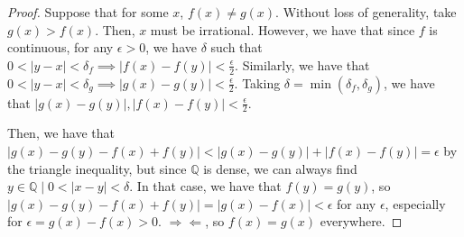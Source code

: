 \documentclass[12pt,letterpaper]{article}
\theoremstyle{definition}
\newcommand{\contra}{\Rightarrow\!\Leftarrow}
\newcommand{\R}{\mathbb{R}}
\newcommand{\Q}{\mathbb{Q}}
\begin{document}
\begin{proof}
  Suppose that for some $x$, $f(x) \neq g(x)$. Without loss of generality,
  take $g(x) > f(x)$. Then, $x$ must be irrational.
  However, we have that since $f$ is continuous, for any $\epsilon > 0$, we have
  $\delta$ such that $0 < |y-x| < \delta_f \implies |f(x) - f(y)| < \frac{\epsilon}{2}$.
  Similarly, we have that $0 < |y-x| < \delta_g \implies |g(x) - g(y)| <
  \frac{\epsilon}{2}$. Taking $\delta = \min(\delta_f, \delta_g)$, we have that $|g(x) -
  g(y)|, |f(x) - f(y)| < \frac{\epsilon}{2}$. 

  Then, we have that $|g(x) - g(y) - f(x) + f(y)| < |g(x) - g(y)| + |f(x) -
  f(y)| = \epsilon$ by the triangle inequality, but since $\Q$ is dense, we can
  always find $y \in \Q \mid 0 < |x-y| < \delta$. In that case, we have that
  $f(y) = g(y)$, so $|g(x) -g(y) - f(x) + f(y)| = |g(x) - f(x)| < \epsilon$ for
  any $\epsilon$, especially for $\epsilon = g(x)
  - f(x) > 0$. $\contra$, so $f(x) = g(x)$ everywhere. 

\end{proof}
\end{document}
